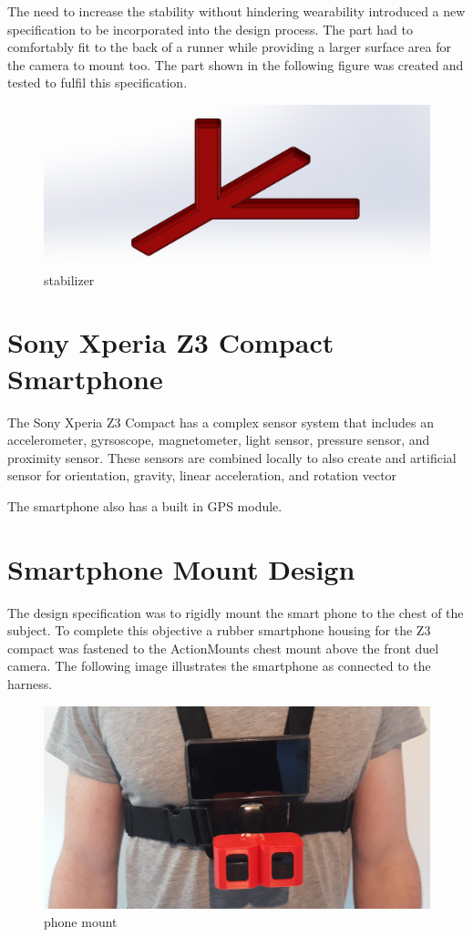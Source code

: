The need to increase the stability without hindering wearability introduced a new specification to be incorporated into the design process. The part had to comfortably fit to the back of a runner while providing a larger surface area for the camera to mount too. The part shown in the following figure was created and tested to fulfil this specification.

\begin{figure}[!ht] 
\captionsetup{width=0.5\linewidth, font=small}  
\includegraphics[width=0.8\linewidth]{figures/stabil.JPG}
\caption{stabilizer}
\label{fig:stabil}
\end{figure}

\section{Sony Xperia Z3 Compact Smartphone}
The Sony Xperia Z3 Compact has a complex sensor system that includes an accelerometer, gyrsoscope, magnetometer, light sensor, pressure sensor, and proximity sensor. These sensors are combined locally to also create and artificial sensor for orientation, gravity, linear acceleration, and rotation vector

The smartphone also has a built in GPS module.



\section{Smartphone Mount Design}
The design specification was to rigidly mount the smart phone to the chest of the subject. To complete this objective a rubber smartphone housing for the Z3 compact was fastened to the ActionMounts chest mount above the front duel camera. The following image illustrates the smartphone as connected to the harness.

\begin{figure}[!ht] 
\captionsetup{width=\linewidth, font=small}  
\includegraphics[width=\linewidth]{figures/pm.JPG}
\caption{phone mount}
\label{fig:pm}
\end{figure}


